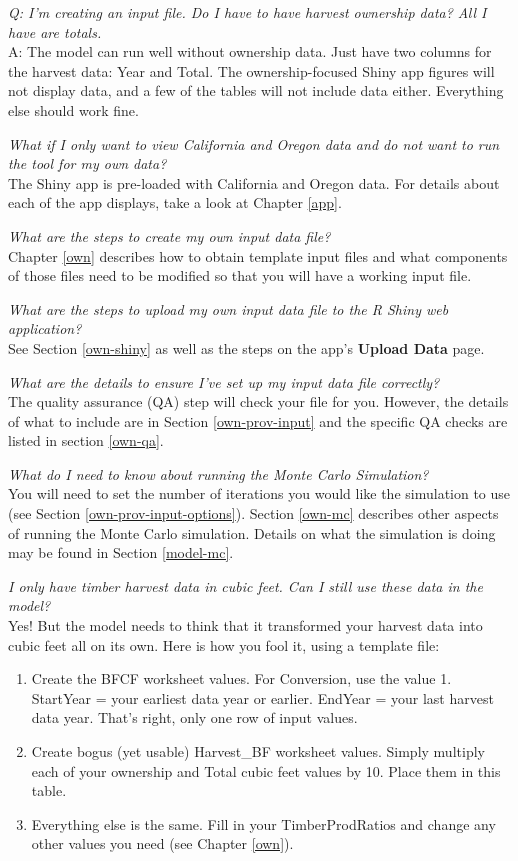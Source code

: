 \documentclass[
  openany]{book}
\providecommand{\tightlist}{%
  \setlength{\itemsep}{0pt}\setlength{\parskip}{0pt}}
\begin{document}
\emph{Q: I'm creating an input file. Do I have to have harvest ownership data? All I have are totals.}\\
A: The model can run well without ownership data. Just have two columns for the harvest data: Year and Total. The ownership-focused Shiny app figures will not display data, and a few of the tables will not include data either. Everything else should work fine.

\emph{What if I only want to view California and Oregon data and do not want to run the tool for my own data?}\\
The Shiny app is pre-loaded with California and Oregon data. For details about each of the app displays, take a look at Chapter \ref{app}.

\emph{What are the steps to create my own input data file?}\\
Chapter \ref{own} describes how to obtain template input files and what components of those files need to be modified so that you will have a working input file.

\emph{What are the steps to upload my own input data file to the R Shiny web application?}\\
See Section \ref{own-shiny} as well as the steps on the app's \textbf{Upload Data} page.

\emph{What are the details to ensure I've set up my input data file correctly? }\\
The quality assurance (QA) step will check your file for you. However, the details of what to include are in Section \ref{own-prov-input} and the specific QA checks are listed in section \ref{own-qa}.

\emph{What do I need to know about running the Monte Carlo Simulation? }\\
You will need to set the number of iterations you would like the simulation to use (see Section \ref{own-prov-input-options}). Section \ref{own-mc} describes other aspects of running the Monte Carlo simulation. Details on what the simulation is doing may be found in Section \ref{model-mc}.

\emph{I only have timber harvest data in cubic feet. Can I still use these data in the model?}\\
Yes! But the model needs to think that it transformed your harvest data into cubic feet all on its own. Here is how you fool it, using a template file:

\begin{enumerate}
\def\labelenumi{\arabic{enumi}.}
\tightlist
\item
  Create the BFCF worksheet values. For Conversion, use the value 1. StartYear = your earliest data year or earlier. EndYear = your last harvest data year. That's right, only one row of input values.\\
\item
  Create bogus (yet usable) Harvest\_BF worksheet values. Simply multiply each of your ownership and Total cubic feet values by 10. Place them in this table.\\
\item
  Everything else is the same. Fill in your TimberProdRatios and change any other values you need (see Chapter \ref{own}).
\end{enumerate}
\end{document}
